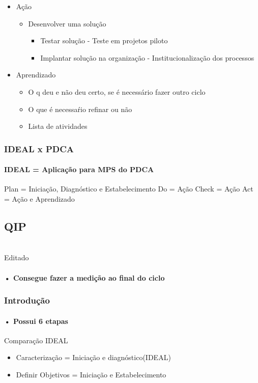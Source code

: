 \documentclass{article}
\begin{document}
\begin{itemize}
	\item Ação
		\begin{itemize}
		\item Desenvolver uma solução
			\begin{itemize}
			\item Testar solução - Teste em projetos piloto
			\item Implantar solução na organização - Institucionalização dos processos
			\end{itemize}
		
		\end{itemize}
			
	\item Aprendizado
		\begin{itemize}
		\item O q deu e não deu certo, se é necessário fazer outro ciclo
		\item O que é necessaŕio refinar ou não
		\item Lista de atividades		
		\end{itemize}

\end{itemize}

\subsubsection{IDEAL x PDCA}
		
\paragraph{	IDEAL = Aplicação para MPS do PDCA}		

Plan = Iniciação, Diagnóstico e Estabelecimento
Do = Ação
Check = Ação
Act = Ação e Aprendizado


\subsection{QIP} \date{28/05/2014}
\\ Editado \date{25/08/14}
\paragraph{• Consegue fazer a medição ao final do ciclo}

\subsubsection{Introdução}

\paragraph{• Possui 6 etapas}
Comparação IDEAL
	\begin{itemize}
	\item Caracterização = Iniciação e diagnóstico(IDEAL)
	\item Definir Objetivos = Iniciação e Estabelecimento
	
	\end{itemize}
\end{document}
